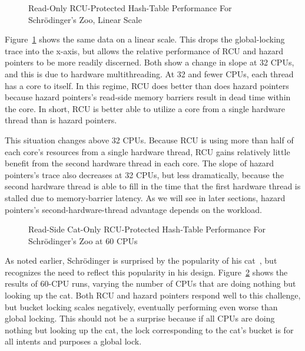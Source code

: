 \begin{figure}[tb]
\centering
{}
\caption{Read-Only RCU-Protected Hash-Table Performance For Schr\"odinger's Zoo, Linear Scale}
\label{fig:datastruct:Read-Only RCU-Protected Hash-Table Performance For Schroedinger's Zoo, Linear Scale}
\end{figure}

Figure~\ref{fig:datastruct:Read-Only RCU-Protected Hash-Table Performance For Schroedinger's Zoo, Linear Scale}
shows the same data on a linear scale.
This drops the global-locking trace into the x-axis, but allows the
relative performance of RCU and hazard pointers to be more readily
discerned.
Both show a change in slope at 32 CPUs, and this is due to hardware
multithreading.
At 32 and fewer CPUs, each thread has a core to itself.
In this regime, RCU does better than does hazard pointers because
hazard pointers's read-side memory barriers result in dead time within
the core.
In short, RCU is better able to utilize a core from a single hardware
thread than is hazard pointers.

This situation changes above 32 CPUs.
Because RCU is using more than half of each core's resources from a
single hardware thread, RCU gains relatively little benefit from the
second hardware thread in each core.
The slope of hazard pointers's trace also decreases at 32 CPUs, but
less dramatically,
because the second hardware thread is able to fill in the time
that the first hardware thread is stalled due to memory-barrier latency.
As we will see in later sections, hazard pointers's second-hardware-thread
advantage depends on the workload.

\begin{figure}[tb]
\centering
{}
\caption{Read-Side Cat-Only RCU-Protected Hash-Table Performance For Schr\"odinger's Zoo at 60 CPUs}
\label{fig:datastruct:Read-Side Cat-Only RCU-Protected Hash-Table Performance For Schroedinger's Zoo at 60 CPUs}
\end{figure}

As noted earlier, Schr\"odinger is surprised by the popularity of his
cat~\cite{ErwinSchroedinger1935Cat}, but recognizes the need to reflect
this popularity in his design.
Figure~\ref{fig:datastruct:Read-Side Cat-Only RCU-Protected Hash-Table Performance For Schroedinger's Zoo at 60 CPUs}
shows the results of 60-CPU runs, varying the number of CPUs that are
doing nothing but looking up the cat.
Both RCU and hazard pointers respond well to this challenge, but
bucket locking scales negatively, eventually performing even worse
than global locking.
This should not be a surprise because if all CPUs are doing nothing
but looking up the cat, the lock corresponding to the cat's bucket
is for all intents and purposes a global lock.

